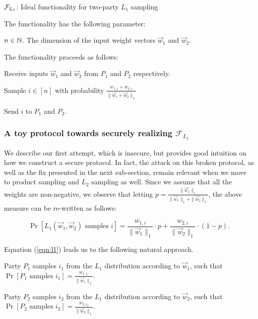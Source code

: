 \bbox
{
\begin{center}
 $\mathcal{F}_{L_1}$:  Ideal functionality for two-party $L_1$ sampling
\end{center}

The functionality has the following parameter:
\BI
\item $n \in \mathbb{N}$. The dimension of the input weight vectors $\vec{w}_1$ and $\vec{w}_2$.
\EI

The functionality proceeds as follows:
\BEN
\item Receive inputs $\vec w_1$ and $\vec w_2$ from $P_1$ and $P_2$
respectively. 
\item Sample $i \in [n]$ with probability $\frac{w_{1,i} +
w_{2,i}}{ \|\vec{w}_1 + \vec{w}_2\|_1 }$
\item Send $i$ to $P_1$ and $P_2$. 

\EEN 
}

\subsubsection{A toy protocol towards securely realizing $\mathcal{F}_{L_1}$}
We describe our first attempt, which is  insecure, but provides good
intuition on how we construct a secure protocol.  In fact, the attack on
this broken protocol, as well as the fix presented in the next
sub-section, remain relevant when we move to product sampling and $L_2$
sampling as well.  Since we assume that all the weights are
non-negative, we observe that letting $p = \frac{\|\vec{w}_1\|_1}{
\|\vec{w}_1\|_1 + \|\vec{w}_2\|_1}$, the above measure can be re-written
as follows:

\begin{equation}
\label{eqn:l1}
\Pr[ L_1(\vec{w}_1, \vec{w}_2) \mbox{ samples } i ] = 
  \frac{w_{1,i}}{\|\vec{w}_1\|_1} \cdot p  + \frac{w_{2,i}}{\|\vec{w}_2\|_1} \cdot (1-p).
\end{equation}


Equation (\ref{eqn:l1}) leads us to the following natural approach.

\BEN
\item Party $P_1$ samples $i_1$ from the $L_1$ distribution according to
$\vec{w}_1$, such that  $\Pr[P_1 \mbox{ samples } i_1] =
\frac{w_{1,i_1}}{\|\vec{w}_1\|_1}$.

\item Party $P_2$ samples $i_2$ from the $L_1$ distribution according to $\vec{w}_2$,
such that $\Pr[P_2 \mbox{ samples } i_2] =
\frac{w_{2,{i_2}}}{\|\vec{w}_2\|_1}$.

